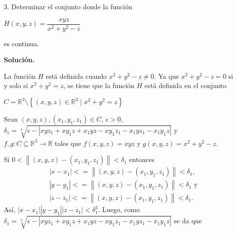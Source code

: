 \documentclass[fleqn]{article}
\begin{document}
    \begin{enumerate}
        \item[3.] Determinar el conjunto donde la función 
        
        $ H(x,y,z) = \dfrac{xyz}{x^2 + y^2 - z} $

        es continua.

        \textbf{Solución.}

        La función $ H $ está definida cuando $ x^2 + y^2 - z \neq 0 $. Ya que $ x^2 + y^2 - z = 0 $ si y solo si $ x^2 + y^2 = z $, se tiene que la función $ H $ está definida en el conjunto

        $ C = \mathbb{R}^3 \setminus \left \{ (x,y,z) \in \mathbb{R}^3 \mid x^2 + y^2 = z \right \} $

        Sean $ (x,y,z), (x_1,y_1,z_1) \in C $, $ \epsilon > 0 $, $ \delta_1 = \displaystyle \sqrt[3]{\epsilon - \left \lvert xyz_1 + xy_1z + x_1yz - xy_1z_1 - x_1yz_1 - x_1y_1z \right \rvert} $ y \\ $ f, g : C \subseteq \mathbb{R}^3 \to \mathbb{R} $ tales que $ f(x,y,z) = xyz $ y $ g(x,y,z) = \displaystyle x^2 + y^2 - z $.

        Si $ 0 < \left\lVert (x,y,z) - (x_1,y_1,z_1) \right\rVert < \delta_1 $ entonces
        \begin{equation*}
            \begin{split}
                & \left\lvert x - x_1 \right\rvert <= \left\lVert (x,y,z) - (x_1,y_1,z_1) \right\rVert < \delta_1, \\
                & \left\lvert y - y_1 \right\rvert <= \left\lVert (x,y,z) - (x_1,y_1,z_1) \right\rVert < \delta_1 \text{ y} \\
                & \left\lvert z - z_1 \right\rvert <= \left\lVert (x,y,z) - (x_1,y_1,z_1) \right\rVert < \delta_1.
            \end{split}
        \end{equation*}
        Así, $ \left\lvert x - x_1 \right\rvert \left\lvert y - y_1 \right\rvert \left\lvert z - z_1 \right\rvert < \delta_1 ^3 $. Luego, como $ \delta_1 = \displaystyle \sqrt[3]{\epsilon - \left \lvert xyz_1 + xy_1z + x_1yz - xy_1z_1 - x_1yz_1 - x_1y_1z \right \rvert} $ se da que


\end{enumerate}
\end{document}
